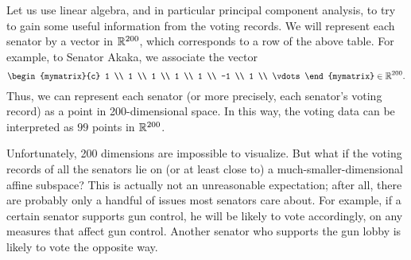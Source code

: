 Let us use linear algebra, and in particular principal component
analysis, to try to gain some useful information from the voting
records. We will represent each senator by a vector in $\mathbb{R}^{200}$,
which corresponds to a row of the above table. For example, to Senator
Akaka, we associate the vector
\begin{equation*}
  \begin{mymatrix}{c} 1 \\ 1 \\ 1 \\ 1 \\ 1 \\ -1 \\ 1 \\ \vdots \end{mymatrix}
  \in\R^{200}.
\end{equation*}
Thus, we can represent each senator (or more precisely, each senator's
voting record) as a point in 200-dimensional space. In this way, the
voting data can be interpreted as $99$ points in $\mathbb{R}^{200}$.

Unfortunately, 200 dimensions are impossible to visualize. But what if
the voting records of all the senators lie on (or at least close to) a
much-smaller-dimensional affine subspace? This is actually not an
unreasonable expectation; after all, there are probably only a handful
of issues most senators care about. For example, if a certain senator
supports gun control, he will be likely to vote accordingly, on any
measures that affect gun control. Another senator who supports the gun
lobby is likely to vote the opposite way.

